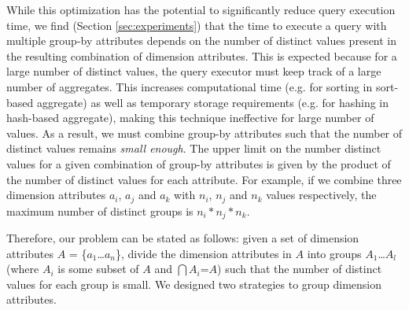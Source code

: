   While this optimization has the potential to significantly reduce query
  execution time, we find (Section \ref{sec:experiments}) that the time to
  execute a query with multiple group-by attributes depends on the number of distinct values
  present in the resulting combination of dimension attributes.
  This is expected because for a large number of distinct values, the query
  executor must keep track of a large number of aggregates. 
  This increases computational time (e.g. for sorting in sort-based aggregate)
  as well as temporary storage requirements (e.g. for hashing in hash-based
  aggregate), making this technique ineffective for large number of values.
  As a result, we must combine group-by attributes such that the number of
  distinct values remains {\it small enough}. 
  The upper limit on the number distinct values for a given combination of
  group-by attributes is given by the product of the number of distinct values
  for each attribute.
  For example, if we combine three dimension attributes $a_i$, $a_j$ and $a_k$
  with $n_i$, $n_j$ and $n_k$ values respectively, the maximum number of
  distinct groups is $n_i\ast n_j \ast n_k$.
  
  Therefore, our problem can be stated as follows:
  given a set of dimension attributes $A$ = \{$a_1$\ldots$a_n$\}, divide the
  dimension attributes in $A$ into groups $A_1$\ldots$A_l$ (where $A_i$ is some
  subset of $A$ and $\bigcap A_i$=$A$) such that the number of distinct values
  for each group is small. We designed two strategies to group dimension
  attributes.
  
